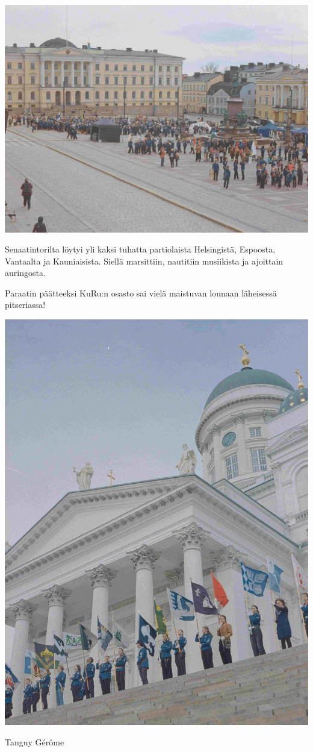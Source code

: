 \begin{multicols}{2}

	\begin{center}
		\noindent\includegraphics[width=0.85\linewidth]{assets/paraati4}
	\end{center}

	\vspace*{-0.16cm}
	\small Senaatintorilta löytyi yli kaksi tuhatta partiolaista Helsingistä, Espoosta, Vantaalta ja Kauniaisista. Siellä marsittiin, nautitiin musiikista ja ajoittain auringosta.

	Paraatin päätteeksi KuRu:n osasto sai vielä maistuvan lounaan läheisessä \mbox{pitseriassa}!

	\columnbreak

	\begin{center}
		\noindent\includegraphics[width=0.85\linewidth]{assets/paraati3}
	\end{center}


\end{multicols}


\medskip
\noindent\null\hfill Tanguy Gérôme
